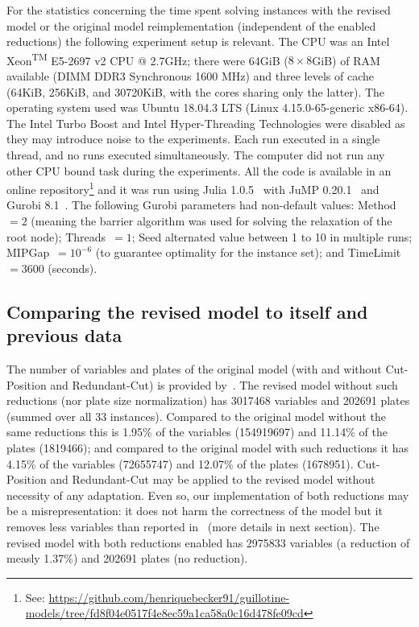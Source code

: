 \documentclass[runningheads]{llncs}
\begin{document}
For the statistics concerning the time spent solving instances with the revised model or the original model reimplementation (independent of the enabled reductions) the following experiment setup is relevant.
The CPU was an Intel\textsuperscript{\textregistered} Xeon\textsuperscript{TM} E5-2697 v2 CPU @ 2.7GHz;
there were 64GiB (\(8 \times 8\)GiB) of RAM available (DIMM DDR3 Synchronous 1600 MHz) and three levels of cache (64KiB, 256KiB, and 30720KiB, with the cores sharing only the latter).
The operating system used was Ubuntu 18.04.3 LTS (Linux 4.15.0-65-generic x86-64).
The Intel\textsuperscript{\textregistered} Turbo Boost and Intel\textsuperscript{\textregistered} Hyper-Threading Technologies were disabled as they may introduce noise to the experiments.
Each run executed in a single thread, and no runs executed simultaneously.
The computer did not run any other CPU bound task during the experiments.
All the code is available in an online repository\footnote{See: \url{https://github.com/henriquebecker91/guillotine-models/tree/fd8f04e0517f4e8ec59a1ca58a0c16d478fe09cd}} and it was run using Julia 1.0.5~\cite{julia} with JuMP 0.20.1~\cite{JuMP} and Gurobi 8.1~\cite{gurobi}.
The following Gurobi parameters had non-default values: Method~\(= 2\) (meaning the barrier algorithm was used for solving the relaxation of the root node); Threads~\(= 1\); Seed alternated value between 1 to 10 in multiple runs; MIPGap~\(= 10^{-6}\) (to guarantee optimality for the instance set); and TimeLimit~\(= 3600\) (seconds).

\subsection{Comparing the revised model to itself and previous data}

The number of variables and plates of the original model (with and without Cut-Position and Redundant-Cut) is provided by~\cite{dimitri_thesis}.
The revised model without such reductions (nor plate size normalization) has 3017468 variables and 202691 plates (summed over all 33 instances). Compared to the original model without the same reductions this is 1.95\% of the variables (154919697) and 11.14\% of the plates (1819466); and compared to the original model with such reductions it has 4.15\% of the variables (72655747) and 12.07\% of the plates (1678951).
Cut-Position and Redundant-Cut may be applied to the revised model without necessity of any adaptation.
Even so, our implementation of both reductions may be a misrepresentation: it does not harm the correctness of the model but it removes less variables than reported in~\cite{dimitri_thesis} (more details in next section).
The revised model with both reductions enabled has 2975833 variables (a reduction of measly 1.37\%) and 202691 plates (no reduction). 
\end{document}
